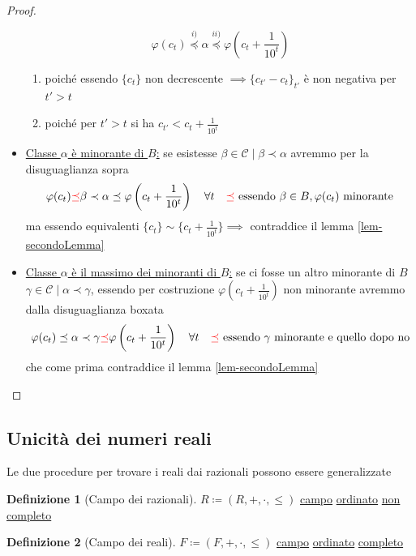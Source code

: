 \documentclass[a4paper,10pt]{article}
\theoremstyle{definition}
\theoremstyle{indentdefinition}
\newtheorem{defn}{Definizione}[section]
\theoremstyle{indentpostulate}
\theoremstyle{indenttheorem}
\theoremstyle{myremark}
\theoremstyle{indentgeneral}
\begin{document}
\begin{proof}
\begin{itemize}
        $$\boxed{\varphi(c_t)\overset{i)}{\preceq}\alpha\overset{ii)}{\preceq}\varphi\left(c_t+\frac{1}{10^t}\right)}$$
        \begin{enumerate}
            \item poiché essendo $\{c_t\}$ non decrescente $\implies \{c_{t'}-c_t\}_{t'}$ è non negativa per $t'>t$
            \item poiché per $t'>t$ si ha $c_{t'}<c_t+\frac{1}{10^t}$
        \end{enumerate}
        \item \underline{Classe $\alpha$ è minorante di $B$:} se esistesse $\beta\in \mathscr{C}\mid \beta\prec \alpha$ avremmo per la disuguaglianza sopra
        $$\varphi(c_t)\textcolor{red}{\preceq}\beta\prec\alpha\preceq\varphi\left(c_t+\frac{1}{10^t}\right)\quad \forall t\quad\textcolor{red}{\preceq}\text{ essendo $\beta\in B,\varphi(c_t)$ minorante} $$
        ma essendo equivalenti $\{c_t\}\sim \{c_t+\frac{1}{10^t}\} \implies$ contraddice il lemma \ref{lem-secondoLemma} \lightning
        \item \underline{Classe $\alpha$ è il massimo dei minoranti di $B$:} se ci fosse un altro minorante di $B$ $\gamma\in\mathscr{C}\mid \alpha\prec\gamma$, essendo per costruzione $\varphi\left(c_t+\frac{1}{10^t}\right)$ non minorante avremmo dalla disuguaglianza boxata
        $$\varphi(c_t)\preceq\alpha\prec\gamma\textcolor{red}{\preceq}\varphi\left(c_t+\frac{1}{10^t}\right)\quad \forall t\quad\textcolor{red}{\preceq}\text{ essendo $\gamma$ minorante e quello dopo no}$$
        che come prima contraddice il lemma \ref{lem-secondoLemma} \lightning
    \end{itemize}
\end{proof}

\subsection{Unicità dei numeri reali}
Le due procedure per trovare i reali dai razionali possono essere generalizzate

\begin{defn}[Campo dei razionali] $R\coloneqq(R,+,\cdot,\le)$ \underline{campo} \underline{ordinato}  \underline{non completo}
\end{defn}

\begin{defn}[Campo dei reali] $F\coloneqq(F,+,\cdot,\le)$ \underline{campo} \underline{ordinato}  \underline{completo}
\end{defn}
\end{document}
